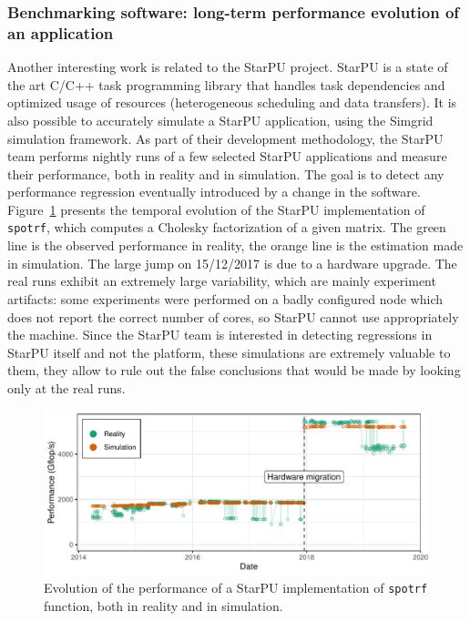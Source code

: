             \subsubsection{Benchmarking software: long-term performance evolution of an application}%

                Another interesting work is related to the StarPU project\cite{AugThiNamWac11CCPE}. StarPU is a state of
                the art C/C++ task programming library that handles task dependencies and optimized usage of resources
                (heterogeneous scheduling and data transfers). It is also possible to accurately simulate a StarPU
                application, using the Simgrid simulation framework\cite{stanisic:hal-01147997}. As part of their
                development methodology, the StarPU team performs nightly runs of a few selected StarPU applications and
                measure their performance, both in reality and in simulation. The goal is to detect any performance
                regression eventually introduced by a change in the software.
                Figure~\ref{fig:non_regression:state_of_art:starpu} presents the temporal evolution of the StarPU
                implementation of \texttt{spotrf}, which computes a Cholesky factorization of a given matrix. The green
                line is the observed performance in reality, the orange line is the estimation made in simulation. The
                large jump on 15/12/2017 is due to a hardware upgrade. The real runs exhibit an extremely large
                variability, which are mainly experiment artifacts: some experiments were performed on a badly
                configured node which does not report the correct number of cores, so StarPU cannot use appropriately
                the machine.  Since the StarPU team is interested in detecting regressions in StarPU itself and not the
                platform, these simulations are extremely valuable to them, they allow to rule out the false conclusions
                that would be made by looking only at the real runs.
                \begin{figure}[htpb]
                    \centering
                    \includegraphics[width=\linewidth]{img/experiment/non_regression/state_of_art/starpu_new.pdf}
                    \caption{Evolution of the performance of a StarPU implementation of \texttt{spotrf} function, both
                    in reality and in simulation\cite{thibault:hal-02943753}.}%
                    \label{fig:non_regression:state_of_art:starpu}
                \end{figure}

